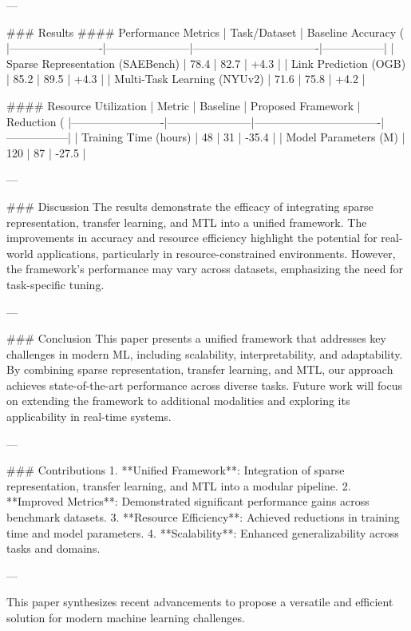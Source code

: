---

### Results
#### Performance Metrics
| Task/Dataset           | Baseline Accuracy (%
|-------------------------|-----------------------|----------------------------------|-----------------|
| Sparse Representation (SAEBench) | 78.4                 | 82.7                             | +4.3            |
| Link Prediction (OGB)  | 85.2                 | 89.5                             | +4.3            |
| Multi-Task Learning (NYUv2) | 71.6                 | 75.8                             | +4.2            |

#### Resource Utilization
| Metric                 | Baseline               | Proposed Framework              | Reduction (%
|-------------------------|-----------------------|----------------------------------|-----------------|
| Training Time (hours)  | 48                    | 31                               | -35.4           |
| Model Parameters (M)   | 120                   | 87                               | -27.5           |

---

### Discussion
The results demonstrate the efficacy of integrating sparse representation, transfer learning, and MTL into a unified framework. The improvements in accuracy and resource efficiency highlight the potential for real-world applications, particularly in resource-constrained environments. However, the framework's performance may vary across datasets, emphasizing the need for task-specific tuning.

---

### Conclusion
This paper presents a unified framework that addresses key challenges in modern ML, including scalability, interpretability, and adaptability. By combining sparse representation, transfer learning, and MTL, our approach achieves state-of-the-art performance across diverse tasks. Future work will focus on extending the framework to additional modalities and exploring its applicability in real-time systems.

---

### Contributions
1. **Unified Framework**: Integration of sparse representation, transfer learning, and MTL into a modular pipeline.
2. **Improved Metrics**: Demonstrated significant performance gains across benchmark datasets.
3. **Resource Efficiency**: Achieved reductions in training time and model parameters.
4. **Scalability**: Enhanced generalizability across tasks and domains.

--- 

This paper synthesizes recent advancements to propose a versatile and efficient solution for modern machine learning challenges.